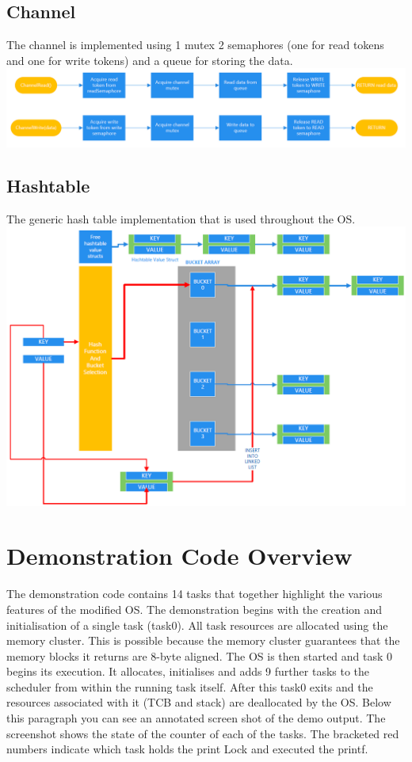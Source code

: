 \documentclass[12pt,a4paper]{article}
\begin{document}
\subsection{Channel}
The channel is implemented using 1 mutex 2 semaphores (one for read tokens and one for write tokens) and a queue for storing the data.\\
\includegraphics[width=1\textwidth]{images/Channel.png}\\
\subsection{Hashtable}
The generic hash table implementation that is used throughout the OS.\\
\includegraphics[width=1\textwidth]{images/hashtable.png}\\

\pagebreak
\section{Demonstration Code Overview}
The demonstration code contains 14 tasks that together highlight the various features of the modified OS. The demonstration begins with the creation and initialisation of a single task (task0). All task resources are allocated using the memory cluster. This is possible because the memory cluster guarantees that the memory blocks it returns are 8-byte aligned. The OS is then started and task 0 begins its execution. It allocates, initialises and adds 9 further tasks to the scheduler from within the running task itself. After this task0 exits and the resources associated with it (TCB and stack) are deallocated by the OS. Below this paragraph you can see an annotated screen shot of the demo output. The screenshot shows the state of the counter of each of the tasks. The bracketed red numbers indicate which task holds the print Lock and executed the printf.\\
\end{document}
